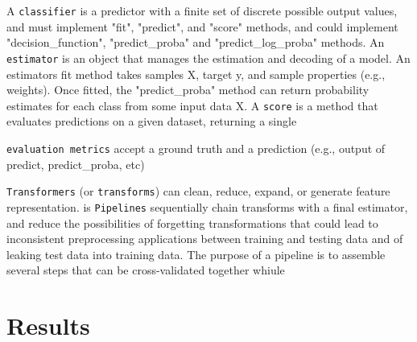 A \texttt{classifier} is a predictor with a finite set of discrete possible output values, and must implement "fit", "predict", and "score" methods, and could implement "decision\_function", "predict\_proba" and "predict\_log\_proba" methods.
An \texttt{estimator} is an object that manages the estimation and decoding of a model. An estimators fit method takes samples X, target y, and sample properties (e.g., weights). Once fitted, the "predict\_proba" method can return probability estimates for each class from some input data X. A \texttt{score} is a method that evaluates predictions on a given dataset, returning a single

\texttt{evaluation metrics} accept a ground truth and a prediction (e.g., output of predict, predict\_proba, etc)

\texttt{Transformers} (or \texttt{transforms}) can clean, reduce, expand, or generate feature representation.
 is
\texttt{Pipelines} sequentially chain transforms with a final estimator, and reduce the possibilities of forgetting transformations that could lead to inconsistent preprocessing applications between training and testing data and of leaking test data into training data. The purpose of a pipeline is to assemble several steps that can be cross-validated together whiule

\section{Results}
\pagebreak

